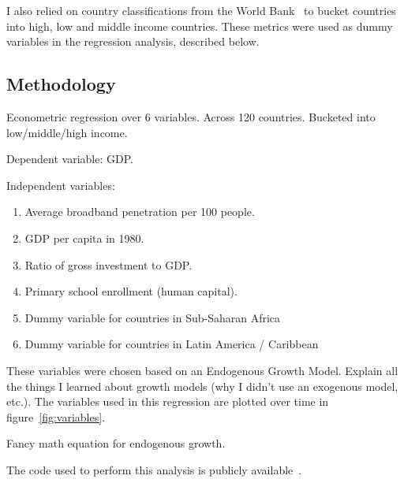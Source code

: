 I also relied on country classifications from the World
Bank~\cite{classifications}
to bucket countries into high, low and middle income countries.
These metrics were used as dummy variables in the regression
analysis, described below.

\subsection{Methodology}

Econometric regression over 6 variables.
Across 120 countries.
Bucketed into low/middle/high income.

Dependent variable: GDP.

Independent variables:
\begin{enumerate}
\item Average broadband penetration per 100 people.
\item GDP per capita in 1980.
\item Ratio of gross investment to GDP.
\item Primary school enrollment (human capital).
\item Dummy variable for countries in Sub-Saharan Africa
\item Dummy variable for countries in Latin America / Caribbean
\end{enumerate}

These variables were chosen based on an Endogenous Growth Model.
Explain all the things I learned about growth models (why I didn't use an
exogenous model, etc.). The variables used in this regression are plotted over time
in figure~\ref{fig:variables}.

Fancy math equation for endogenous growth.

The code used to perform this analysis is publicly available~\cite{github}.


